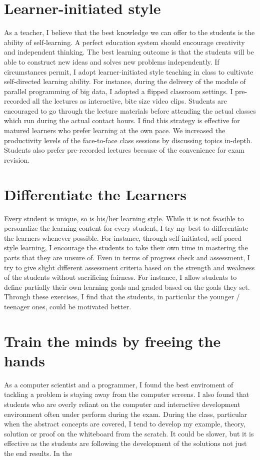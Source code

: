 \documentclass[12pt]{article}
\theoremstyle{plain} \numberwithin{equation}{section}
\theoremstyle{definition}
\begin{document}
\section{Learner-initiated style}
As a teacher, I believe that the best knowledge we can offer
to the students is the ability of self-learning. 
A perfect education system should encourage creativity and independent 
thinking. The best learning outcome is that the students will be able to construct 
new ideas and solves new problems independently. If circumstances
permit, I adopt learner-initiated style teaching in class to cultivate
self-directed learning ability. For instance, during the delivery of
the module of parallel programming of big data, I adopted a flipped
classroom settings. I pre-recorded all the lectures as interactive,
bite size video clips. Students are encouraged to go through the
lecture materials before attending the actual classes which run during
the actual contact hours. I find this strategy is effective for
matured learners who prefer learning at the own pace. We increased the
productivity levels of the face-to-face class sessions by discussing
topics in-depth. Students also prefer pre-recorded lectures because of
the convenience for exam revision.


\section{Differentiate the Learners}
Every student is unique, so is his/her learning style. While
it is not feasible to personalize
the learning content for every student, I try my best to differentiate
the learners whenever possible. For instance, through self-initiated,
self-paced style learning, I encourage the students to take their own
time in mastering the parts that they are unsure of. Even in terms of
progress check and assessment, I try to give slight different
assessment criteria based on the strength and weakness of the students
without sacrificing fairness. For instance, I allow students to define
partially their own learning goals and graded based on the goals they
set. Through these exercises, I find that the students, in particular
the younger / teenager ones, could be motivated better.


\section{Train the minds by freeing the hands}
As a computer scientist and a programmer, I found the best enviroment
of tackling a problem is staying away from the computer screens. I
also found that students who are overly reliant on the computer and
interactive development environment often under perform during the
exam. During the class, particular when the abstract concepts are
covered, I tend to develop my example, theory, solution or proof on
the whiteboard from the scratch. It could be slower, but it is
effective as the students are following the development of the
solutions not just the end results. In the  
\end{document}
